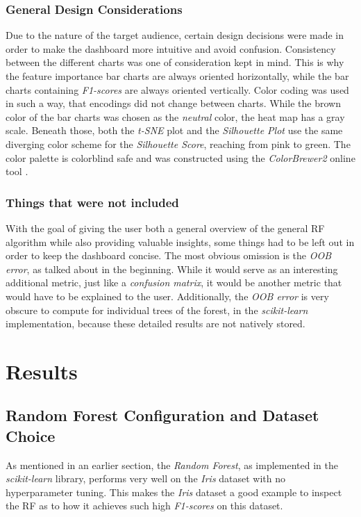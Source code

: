 \documentclass[a4paper, 12pt]{article}
\begin{document}
\subsubsection{General Design Considerations}
Due to the nature of the target audience, certain design decisions were made in order to make the
dashboard more intuitive and avoid confusion. Consistency between the different charts was one of
consideration kept in mind. This is why the feature importance bar charts are always oriented
horizontally, while the bar charts containing \textit{F1-scores} are always oriented vertically.
Color coding was used in such a way, that encodings did not change between charts. While the brown
color of the bar charts was chosen as the \textit{neutral} color, the heat map has a gray scale.
Beneath those, both the \textit{t-SNE} plot and the \textit{Silhouette Plot} use the same diverging
color scheme for the \textit{Silhouette Score}, reaching from pink to green. The color palette is
colorblind safe and was constructed using the \textit{ColorBrewer2} \cite{brewer1994guidelines}
online tool \cite{harrower2003colorbrewer}.

\subsubsection{Things that were not included}
With the goal of giving the user both a general overview of the general RF algorithm while also
providing valuable insights, some things had to be left out in order to keep the dashboard concise.
The most obvious omission is the \textit{OOB error}, as talked about in the beginning. While it
would serve as an interesting additional metric, just like a \textit{confusion matrix}, it would
be another metric that would have to be explained to the user. Additionally, the \textit{OOB error}
is very obscure to compute for individual trees of the forest, in the \textit{scikit-learn}
implementation, because these detailed results are not natively stored.

\section{Results}
\subsection{Random Forest Configuration and Dataset Choice}
As mentioned in an earlier section, the \textit{Random Forest}, as implemented in the
\textit{scikit-learn} library, performs very well on the \textit{Iris} dataset with no hyperparameter
tuning. This makes the \textit{Iris} dataset a good example to inspect the RF as to how it achieves
such high \textit{F1-scores} on this dataset. \par
\end{document}
